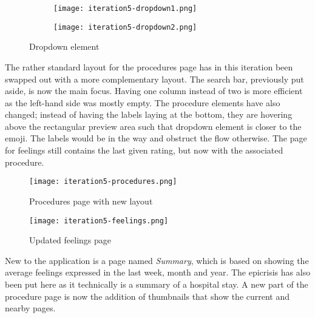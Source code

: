 \begin{figure}
    \centering
    \begin{subfigure}[t]{0.45\textwidth}
        \centering
        \vspace{0pt}
        \texttt{[image: iteration5-dropdown1.png]}
        \label{fig:i5-dropdown1}
    \end{subfigure}
    \begin{subfigure}[t]{0.45\textwidth}
        \centering
        \vspace{0pt}
        \texttt{[image: iteration5-dropdown2.png]}
        \label{fig:i5-dropdown2}
    \end{subfigure}
    \caption{Dropdown element}
    \label{fig:i5-dropdown}
\end{figure}

The rather standard layout for the procedures page has in this iteration been swapped out with a more complementary layout. The search bar, previously put aside, is now the main focus. Having one column instead of two is more efficient as the left-hand side was mostly empty. The procedure elements have also changed; instead of having the labels laying at the bottom, they are hovering above the rectangular preview area such that dropdown element is closer to the emoji. The labels would be in the way and obstruct the flow otherwise. The page for feelings still contains the last given rating, but now with the associated procedure.

\begin{figure}
    \centering
    \begin{minipage}{0.45\textwidth}
        \centering
        \texttt{[image: iteration5-procedures.png]}
        \caption{Procedures page with new layout}
        \label{fig:i5-procedures}
    \end{minipage}
    \begin{minipage}{0.45\textwidth}
        \centering
        \texttt{[image: iteration5-feelings.png]}
        \caption{Updated feelings page}
        \label{fig:i5-feelings}
    \end{minipage}
\end{figure}

New to the application is a page named \emph{Summary}, which is based on showing the average feelings expressed in the last week, month and year. The epicrisis has also been put here as it technically is a summary of a hospital stay. A new part of the procedure page is now the addition of thumbnails that show the current and nearby pages.


